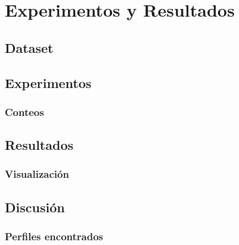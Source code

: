 
\chapter{Experimentos y Resultados}
\label{sec:results}

\section{Dataset}
\label{sec:concepts:sec1}
{
\color{gray}
\Blindtext[2][2]
}

{
\color{gray}
\Blindtext[2][1]
}


\section{Experimentos}
\label{sec:concepts:sec1}
{
\color{gray}
\Blindtext[2][2]
}

\subsection{Conteos}
\label{sec:intro:results:refs:method}
{
\color{gray}
\Blindtext[1][2]
}

\section{Resultados}
\label{sec:concepts:sec2}
{
\color{gray}
\Blindtext[3][2]
}

\subsection{Visualización}
\label{sec:intro:results:refs:method}
{
\color{gray}
\Blindtext[1][2]
}

\section{Discusión}
\label{sec:concepts:sec3}
{
\color{gray}
\Blindtext[3][2]
}

\subsection{Perfiles encontrados}
\label{sec:intro:results:refs:method}
{
\color{gray}
\Blindtext[1][2]
}

